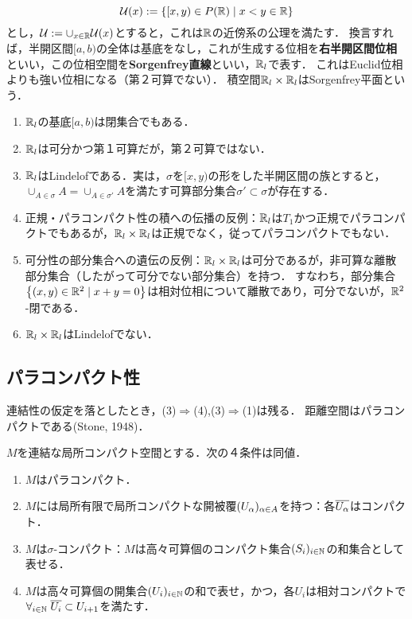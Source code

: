 \documentclass[uplatex,dvipdfmx]{jsreport}
\begin{document}
\begin{example}
    \[\mathcal{U}(x):=\left\{[x,y)\in P(\mathbb{R})\mid x<y\in\mathbb{R}\right\}\]
    とし，$\mathcal{U}:=\cup_{x\in\mathbb{R}}\mathcal{U}(x)$とすると，これは$\mathbb{R}$の近傍系の公理を満たす．
    換言すれば，半開区間$[a,b)$の全体は基底をなし，これが生成する位相を\textbf{右半開区間位相}といい，この位相空間を\textbf{Sorgenfrey直線}といい，$\mathbb{R}_l$で表す．
    これはEuclid位相よりも強い位相になる（第２可算でない）．
    積空間$\mathbb{R}_l\times\mathbb{R}_l$はSorgenfrey平面という．
    \begin{enumerate}
        \item $\mathbb{R}_l$の基底$[a,b)$は閉集合でもある．
        \item $\mathbb{R}_l$は可分かつ第１可算だが，第２可算ではない．
        \item $\mathbb{R}_l$はLindelofである．実は，$\sigma$を$[x,y)$の形をした半開区間の族とすると，$\cup_{A\in\sigma}A=\cup_{A\in\sigma'}A$を満たす可算部分集合$\sigma'\subset\sigma$が存在する．
        \item 正規・パラコンパクト性の積への伝播の反例：$\mathbb{R}_l$は$T_1$かつ正規でパラコンパクトでもあるが，$\mathbb{R}_l\times\mathbb{R}_l$は正規でなく，従ってパラコンパクトでもない．
        \item 可分性の部分集合への遺伝の反例：$\mathbb{R}_l\times\mathbb{R}_l$は可分であるが，非可算な離散部分集合（したがって可分でない部分集合）を持つ．
        すなわち，部分集合$\left\{(x,y)\in\mathbb{R}^2\mid x+y=0\right\}$は相対位相について離散であり，可分でないが，$\mathbb{R}^2$-閉である．
        \item $\mathbb{R}_l\times\mathbb{R}_l$はLindelofでない．
    \end{enumerate}
\end{example}

\subsection{パラコンパクト性}

\begin{tcolorbox}[colframe=ForestGreen, colback=ForestGreen!10!white,breakable,colbacktitle=ForestGreen!40!white,coltitle=black,fonttitle=\bfseries\sffamily,
title=]
    連結性の仮定を落としたとき，(3)$\Rightarrow$(4),(3)$\Rightarrow$(1)は残る．
    距離空間はパラコンパクトである(Stone, 1948)．
\end{tcolorbox}

\begin{theorem}[局所コンパクト空間のパラコンパクト性の特徴付け]
    $M$を連結な局所コンパクト空間とする．次の４条件は同値．
    \begin{enumerate}
        \item $M$はパラコンパクト．
        \item $M$には局所有限で局所コンパクトな開被覆$(U_\alpha)_{\alpha\in A}$を持つ：各$\overline{U_\alpha}$はコンパクト．
        \item $M$は$\sigma$-コンパクト：$M$は高々可算個のコンパクト集合$(S_i)_{i\in\mathbb{N}}$の和集合として表せる．
        \item $M$は高々可算個の開集合$(U_i)_{i\in\mathbb{N}}$の和で表せ，かつ，各$U_i$は相対コンパクトで$\forall_{i\in\mathbb{N}}\;\overline{U_i}\subset U_{i+1}$を満たす．
    \end{enumerate}
\end{theorem}
\end{document}
